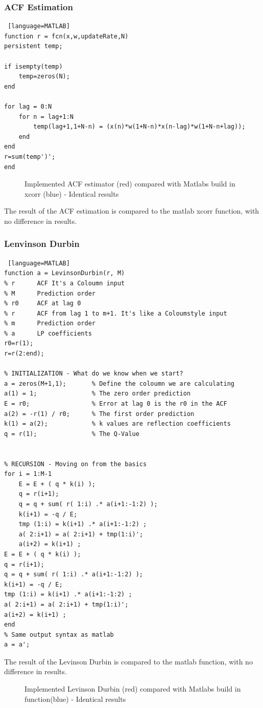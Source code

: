 \subsubsection{ACF Estimation}
\begin{lstlisting} [language=MATLAB]
function r = fcn(x,w,updateRate,N)
persistent temp;

if isempty(temp)
	temp=zeros(N);
end

for lag = 0:N
	for n = lag+1:N
		temp(lag+1,1+N-n) = (x(n)*w(1+N-n)*x(n-lag)*w(1+N-n+lag));
	end
end
r=sum(temp')';
end
\end{lstlisting}

\begin{figure}[H]
	\centering
	
	\caption{Implemented ACF estimator (red) compared with Matlabs build in xcorr (blue) - Identical results}
	\label{fig:ACFTest}
\end{figure}
The result of the ACF estimation is compared to the matlab xcorr function, with no difference in results.   
\subsubsection{Lenvinson Durbin}
\begin{lstlisting} [language=MATLAB]
function a = LevinsonDurbin(r, M)
% r      ACF It's a Coloumn input
% M      Prediction order
% r0     ACF at lag 0
% r      ACF from lag 1 to m+1. It's like a Coloumstyle input
% m      Prediction order
% a      LP coefficients
r0=r(1);
r=r(2:end);

% INITIALIZATION - What do we know when we start?
a = zeros(M+1,1);       % Define the coloumn we are calculating
a(1) = 1;               % The zero order prediction
E = r0;                 % Error at lag 0 is the r0 in the ACF
a(2) = -r(1) / r0;      % The first order prediction
k(1) = a(2);            % k values are reflection coefficients
q = r(1);               % The Q-Value


% RECURSION - Moving on from the basics
for i = 1:M-1
	E = E + ( q * k(i) );                   
	q = r(i+1);
	q = q + sum( r( 1:i) .* a(i+1:-1:2) );
	k(i+1) = -q / E;
	tmp (1:i) = k(i+1) .* a(i+1:-1:2) ;
	a( 2:i+1) = a( 2:i+1) + tmp(1:i)';
	a(i+2) = k(i+1) ;
E = E + ( q * k(i) );                   
q = r(i+1);
q = q + sum( r( 1:i) .* a(i+1:-1:2) );
k(i+1) = -q / E;
tmp (1:i) = k(i+1) .* a(i+1:-1:2) ;
a( 2:i+1) = a( 2:i+1) + tmp(1:i)';
a(i+2) = k(i+1) ;
end
% Same output syntax as matlab
a = a';
\end{lstlisting}
The result of the Levinson Durbin is compared to the matlab function, with no difference in results.   
\begin{figure}[H]
	\centering
	
	\caption{Implemented Levinson Durbin (red) compared with Matlabs build in function(blue) - Identical results}
	\label{fig:LDTest}
\end{figure}

